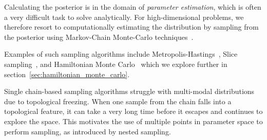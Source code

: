 \documentclass[11pt]{article}
\begin{document}
    Calculating the posterior is in the domain of \emph{parameter estimation}, which is often a very difficult task
    to solve analytically.
    For high-dimensional problems, we therefore resort to computationally estimating the distribution by sampling
    from the posterior using Markov-Chain Monte-Carlo techniques~\cite{gupta2014comparison, delmoral2013mean}.

    Examples of such sampling algorithms include Metropolis-Hastings~\cite{Metropolis_OG},
    Slice sampling~\cite{neal2003slice}, and Hamiltonian Monte Carlo~\cite{HMC_Duane, neal1996monte} which
    we explore further in section~\ref{sec:hamiltonian_monte_carlo}.

    Single chain-based sampling algorithms struggle with multi-modal distributions due to topological freezing.
    When one sample from the chain falls into a topological feature, it can take a very long time before it escapes and
    continues to explore the space.
    This motivates the use of multiple points in parameter space to perform sampling, as introduced by nested sampling.
\end{document}
